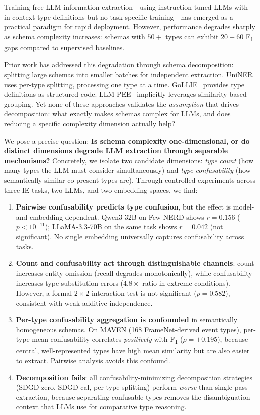 \documentclass[11pt,a4paper]{article}
\begin{document}
Training-free LLM information extraction---using instruction-tuned LLMs with in-context type definitions but no task-specific training---has emerged as a practical paradigm for rapid deployment.
However, performance degrades sharply as schema complexity increases: schemas with $50{+}$ types can exhibit $20{-}60$ F\textsubscript{1} gaps compared to supervised baselines.

Prior work has addressed this degradation through schema decomposition: splitting large schemas into smaller batches for independent extraction.
UniNER~\cite{universal_ner_2024} uses per-type splitting, processing one type at a time.
GoLLIE~\cite{gollie_2024} provides type definitions as structured code.
LLM-PEE~\cite{llmpee_2024} implicitly leverages similarity-based grouping.
Yet none of these approaches validates the \emph{assumption} that drives decomposition: what exactly makes schemas complex for LLMs, and does reducing a specific complexity dimension actually help?

We pose a precise question: \textbf{Is schema complexity one-dimensional, or do distinct dimensions degrade LLM extraction through separable mechanisms?}
Concretely, we isolate two candidate dimensions: \emph{type count} (how many types the LLM must consider simultaneously) and \emph{type confusability} (how semantically similar co-present types are).
Through controlled experiments across three IE tasks, two LLMs, and two embedding spaces, we find:

\begin{enumerate}[leftmargin=2em,itemsep=2pt]
\item \textbf{Pairwise confusability predicts type confusion}, but the effect is model- and embedding-dependent.
Qwen3-32B on Few-NERD shows $r{=}0.156$ ($p{<}10^{-11}$); LLaMA-3.3-70B on the same task shows $r{=}0.042$ (not significant).
No single embedding universally captures confusability across tasks.

\item \textbf{Count and confusability act through distinguishable channels}: count increases entity omission (recall degrades monotonically), while confusability increases type substitution errors ($4.8{\times}$ ratio in extreme conditions).
However, a formal $2{\times}2$ interaction test is not significant ($p{=}0.582$), consistent with weak additive independence.

\item \textbf{Per-type confusability aggregation is confounded} in semantically homogeneous schemas.
On MAVEN (168 FrameNet-derived event types), per-type mean confusability correlates \emph{positively} with F\textsubscript{1} ($\rho{=}{+}0.195$), because central, well-represented types have high mean similarity but are also easier to extract.
Pairwise analysis avoids this confound.

\item \textbf{Decomposition fails}: all confusability-minimizing decomposition strategies (SDGD-zero, SDGD-cal, per-type splitting) perform \emph{worse} than single-pass extraction, because separating confusable types removes the disambiguation context that LLMs use for comparative type reasoning.
\end{enumerate}
\end{document}
